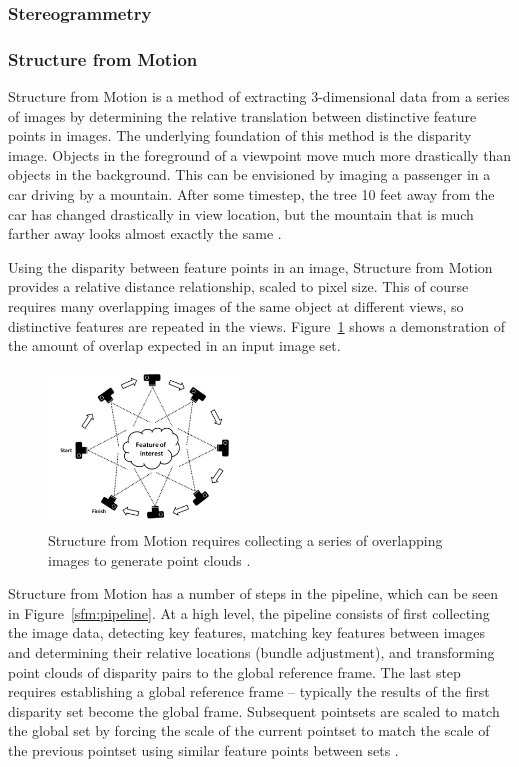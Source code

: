 \documentclass[12pt]{drexelthesis}
\let\Oldsubsubsection\subsubsection
\renewcommand{\subsubsection}{\FloatBarrier\Oldsubsubsection}
\begin{document}
\subsubsection{Stereogrammetry}
\subsubsection{Structure from Motion}

Structure from Motion is a method of extracting 3-dimensional data from a series of images by determining the relative translation between distinctive feature points in images. The underlying foundation of this method is the disparity image. Objects in the foreground of a viewpoint move much more drastically than objects in the background. This can be envisioned by imaging a passenger in a car driving by a mountain. After some timestep, the tree 10 feet away from the car has changed drastically in view location, but the mountain that is much farther away looks almost exactly the same \cite{RN20}.

Using the disparity between feature points in an image, Structure from Motion provides a relative distance relationship, scaled to pixel size. This of course requires many overlapping images of the same object at different views, so distinctive features are repeated in the views. Figure~\ref{sfm:imageoverlap} shows a demonstration of the amount of overlap expected in an input image set.

\begin{figure}[!ht]
	\centering
	\includegraphics[width=2in]{instruments/sfmimagecollection.png}
	\caption[Structure from Motion collection method]{\centering Structure from Motion requires collecting a series of overlapping images to generate point clouds \cite{WESTOBY2012300}.}
	\label{sfm:imageoverlap}
\end{figure}

Structure from Motion has a number of steps in the pipeline, which can be seen in Figure~\ref{sfm:pipeline}. At a high level, the pipeline consists of first collecting the image data, detecting key features, matching key features between images and determining their relative locations (bundle adjustment), and transforming point clouds of disparity pairs to the global reference frame. The last step requires establishing a global reference frame -- typically the results of the first disparity set become the global frame. Subsequent pointsets are scaled to match the global set by forcing the scale of the current pointset to match the scale of the previous pointset using similar feature points between sets \cite{WESTOBY2012300}.
\end{document}
